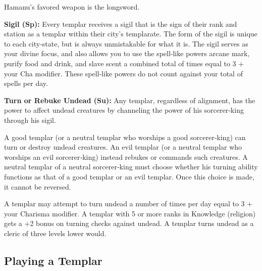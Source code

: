 
Hamanu's favored weapon is the longsword.

\textbf{Sigil (Sp):} Every templar receives a sigil that is the sign of their rank and station as a templar within their city's templarate. The form of the sigil is unique to each city‐state, but is always unmistakable for what it is. The sigil serves as your divine focus, and also allows you to use the spell‐like powers arcane mark, purify food and drink, and slave scent a combined total of times equal to 3 + your Cha modifier. These spell‐like powers do not count against your total of spells per day.

\textbf{Turn or Rebuke Undead (Su):} Any templar, regardless of alignment, has the power to affect undead creatures by channeling the power of his sorcerer‐king through his sigil.

A good templar (or a neutral templar who worships a good sorcerer‐king) can turn or destroy undead creatures. An evil templar (or a neutral templar who worships an evil sorcerer‐king) instead rebukes or commands such creatures. A neutral templar of a neutral sorcerer‐king must choose whether his turning ability functions as that of a good templar or an evil templar. Once this choice is made, it cannot be reversed.

A templar may attempt to turn undead a number of times per day equal to 3 + your Charisma modifier. A templar with 5 or more ranks in Knowledge (religion) gets a +2 bonus on turning checks against undead. A templar turns undead as a cleric of three levels lower would.

\subsection{Playing a Templar}

